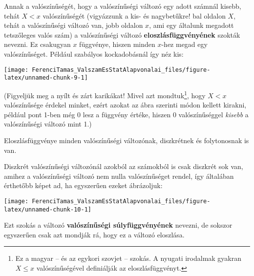 \documentclass[magyar,]{book}
\let\rmarkdownfootnote\footnote%
\def\footnote{\protect\rmarkdownfootnote}
\begin{document}
Annak a valószínűségét, hogy a valószínűségi változó egy adott számnál kisebb, tehát \(X<x\) valószínűségét (vigyázzunk a kis- és nagybetűkre! bal oldalon \(X\), tehát a valószínűségi változó van, jobb oldalon \(x\), ami egy általunk megadott tetszőleges valós szám) a valószínűségi változó \textbf{eloszlásfüggvényének} szokták nevezni. Ez csakugyan \(x\) függvénye, hiszen minden \(x\)-hez megad egy valószínűséget. Például szabályos kockadobásnál így néz kis:

\begin{center}\texttt{[image: FerenciTamas\_ValszamEsStatAlapvonalai\_files/figure-latex/unnamed-chunk-9-1]} \end{center}

(Figyeljük meg a nyílt és zárt karikákat! Mivel azt mondtuk\footnote{Ez a magyar -- és az egykori szovjet -- szokás. A nyugati irodalmak gyakran \(X\leq x\) valószínűségével definiálják az eloszlásfüggvényt.}, hogy \(X<x\) valószínűsége érdekel minket, ezért azokat az ábra szerinti módon kellett kirakni, például pont 1-ben még 0 lesz a függvény értéke, hiszen 0 valószínűséggel \emph{kisebb} a valószínűségi változó mint 1.)

Eloszlásfüggvénye minden valószínűségi változónak, diszkrétnek és folytonosnak is van.

Diszkrét valószínűségi változónál azokból az számokból is csak diszkrét sok van, amihez a valószínűségi változó nem nulla valószínűséget rendel, így általában érthetőbb képet ad, ha egyszerűen ezeket ábrázoljuk:

\begin{center}\texttt{[image: FerenciTamas\_ValszamEsStatAlapvonalai\_files/figure-latex/unnamed-chunk-10-1]} \end{center}

Ezt szokás a változó \textbf{valószínűségi súlyfüggvényének} nevezni, de sokszor egyszerűen csak azt mondják rá, hogy ez a változó eloszlása.
\end{document}
